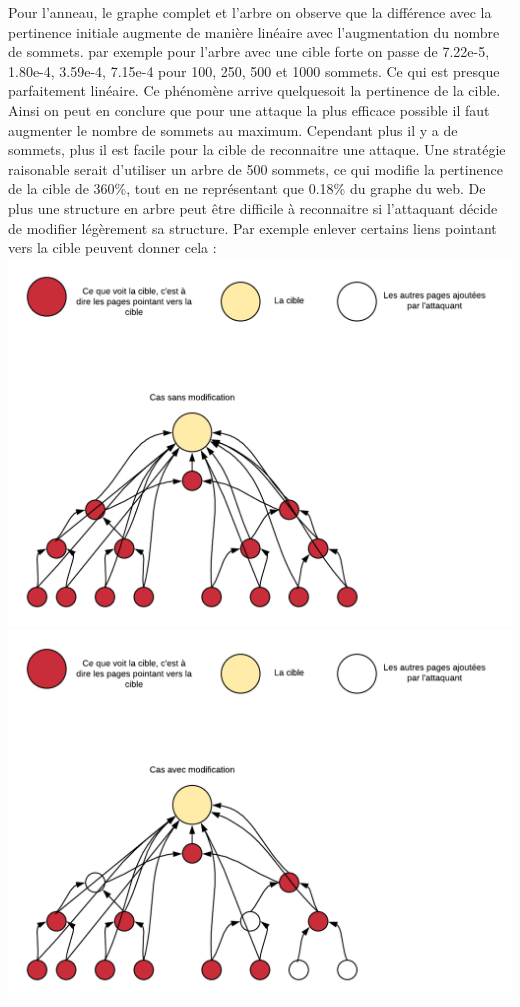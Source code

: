 \documentclass[a4paper,11pt]{article}
\begin{document}
		Pour l'anneau, le graphe complet et l'arbre on observe que la différence avec la pertinence initiale augmente de manière linéaire avec l'augmentation du nombre de sommets.
		par exemple pour l'arbre avec une cible forte on passe de 7.22e-5, 1.80e-4, 3.59e-4, 7.15e-4 pour 100, 250, 500 et 1000 sommets. Ce qui est presque parfaitement linéaire.
		Ce phénomène arrive quelquesoit la pertinence de la cible. Ainsi on peut en conclure que pour une attaque la plus efficace possible il faut augmenter le nombre de sommets au maximum.
		Cependant plus il y a de sommets, plus il est facile pour la cible de reconnaitre une attaque. Une stratégie raisonable serait d'utiliser un arbre de 500 sommets, 
		ce qui modifie la pertinence de la cible de 360\%, tout en ne représentant que 0.18\% du graphe du web. De plus une structure en arbre peut être difficile à reconnaitre si l'attaquant décide 
		de modifier légèrement sa structure. Par exemple enlever certains liens pointant vers la cible peuvent donner cela : \\
		\includegraphics[scale = 0.5]{Captures/diagramme1.png}\\
		\includegraphics[scale = 0.5]{Captures/diagramme2.png}\\
\end{document}
